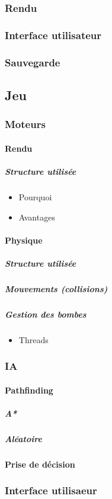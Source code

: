 \documentclass[a4paper,11pt]{report}
\begin{document}
			\subsubsection{Rendu}
			\subsubsection{Interface utilisateur}
			\subsubsection{Sauvegarde}
		\subsection{Jeu}
			\subsubsection{Moteurs}
				\paragraph{Rendu}
					\subparagraph{Structure utilisée}
					\begin{itemize}
						\item{Pourquoi}
						\item{Avantages}
					\end{itemize}
				\paragraph{Physique}
					\subparagraph{Structure utilisée}
					\subparagraph{Mouvements (collisions)}
					\subparagraph{Gestion des bombes}
						\begin{itemize}
							\item{Threads}
						\end{itemize}
			\subsubsection{IA}
				\paragraph{Pathfinding}
					\subparagraph{A*}
					\subparagraph{Aléatoire}
				\paragraph{Prise de décision}
			\subsubsection{Interface utilisaeur}
\end{document}
